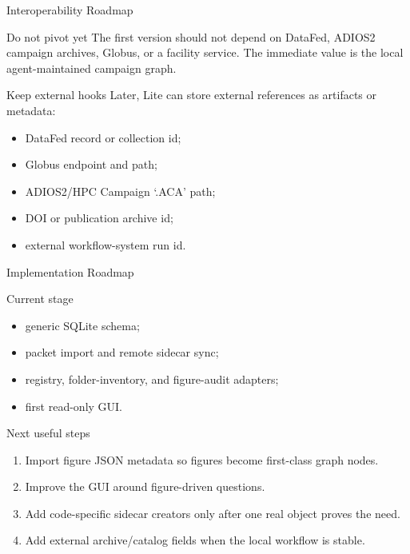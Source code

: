 \documentclass[aspectratio=169,11pt]{beamer}
\begin{document}
\begin{frame}{Interoperability Roadmap}
  \begin{block}{Do not pivot yet}
    \small
    The first version should not depend on DataFed, ADIOS2 campaign archives,
    Globus, or a facility service.  The immediate value is the local
    agent-maintained campaign graph.
  \end{block}

  \begin{block}{Keep external hooks}
    \small
    Later, Lite can store external references as artifacts or metadata:
    \begin{itemize}
      \item DataFed record or collection id;
      \item Globus endpoint and path;
      \item ADIOS2/HPC Campaign `.ACA' path;
      \item DOI or publication archive id;
      \item external workflow-system run id.
    \end{itemize}
  \end{block}
\end{frame}

\begin{frame}{Implementation Roadmap}
  \begin{block}{Current stage}
    \small
    \begin{itemize}
      \item generic SQLite schema;
      \item packet import and remote sidecar sync;
      \item registry, folder-inventory, and figure-audit adapters;
      \item first read-only GUI.
    \end{itemize}
  \end{block}

  \begin{block}{Next useful steps}
    \small
    \begin{enumerate}
      \item Import figure JSON metadata so figures become first-class graph nodes.
      \item Improve the GUI around figure-driven questions.
      \item Add code-specific sidecar creators only after one real object proves the need.
      \item Add external archive/catalog fields when the local workflow is stable.
    \end{enumerate}
  \end{block}
\end{frame}
\end{document}
